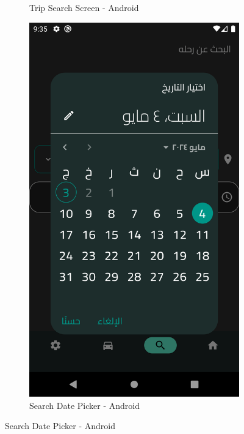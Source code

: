 \documentclass[a4paper, 12pt]{report} %
\begin{document}
\begin{figure}[H]
\begin{subfigure}{0.31\textwidth}
                    \caption{Trip Search Screen - Android}
                    \label{fig:trip_search_2}
                \end{subfigure}
                \begin{subfigure}{0.31\textwidth}
                    \includegraphics[width=\linewidth]{Images/trip_search_3.png}
                    \caption{Search Date Picker - Android}
                    \label{fig:trip_search_3}
                \end{subfigure}

\end{figure}
\end{document}
